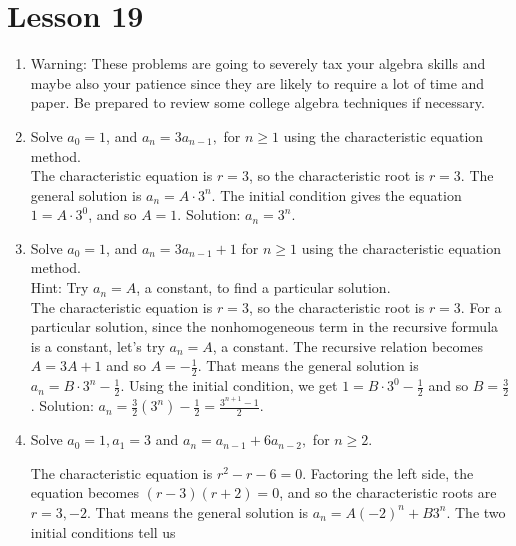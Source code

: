 \documentclass[11pt]{amsart}
\begin{document}
\section{Lesson 19}

\begin{enumerate}

\item[] 
\begin{center}
{\small Warning: These problems are going to severely tax your algebra skills and maybe also your patience since they are likely to require a lot of time and paper. Be prepared to review some college algebra techniques if necessary.}\\[5pt]
\end{center}

\item Solve $a_0=1$, and $a_n=3a_{n-1},$ for $n\geq 1$ using the characteristic equation method.\\[3pt]

{\color{blue}
The characteristic equation is $r = 3$, so the characteristic root is $r = 3$. The general solution is $a_{n}= A\cdot 3^{n}$. The initial condition gives the equation $1 = A\cdot3^{0}$, and so $A=1$. Solution: $a_{n} = 3^{n}.$\\[5pt]
}


\item Solve $a_0=1$, and $a_n=3a_{n-1} + 1$ for $n\geq 1$ using the characteristic equation method.\\ Hint: Try $a_{n}= A$, a constant,  to find a particular solution.\\[3pt]

{\color{blue}
The characteristic equation is $r = 3$, so the characteristic root is $r = 3$. For a particular solution, since the nonhomogeneous term in the recursive formula is a constant, let's try $a_{n} = A$, a constant. The recursive relation becomes $A = 3A+1$ and so $A= -\frac{1}{2}$. That means the general solution is $a_{n} = B\cdot 3^{n}- \frac{1}{2}$. Using the initial condition, we get
$1 = B\cdot3^{0}-\frac{1}{2}$ and so $B = \frac{3}{2}$. Solution:
$a_{n} = \frac{3}{2}(3^{n}) -\frac{1}{2} =\frac{3^{n+1}-1}{2}$.\\[5pt]
}

\item    Solve $a_0=1, a_1=3$ and $a_n=a_{n-1}+6a_{n-2},$ for $n\geq 2$.\\[3pt]

{\color{blue}
The characteristic equation is $r^{2} -r-6 = 0$. Factoring the left side, the equation becomes 
$(r-3)(r+2)=0$, and so the characteristic roots are $r = 3, -2$. That means the general solution is 
$a_{n} = A(-2)^{n} + B3^{n}$. The two initial conditions tell us 

}
\end{enumerate}
\end{document}
